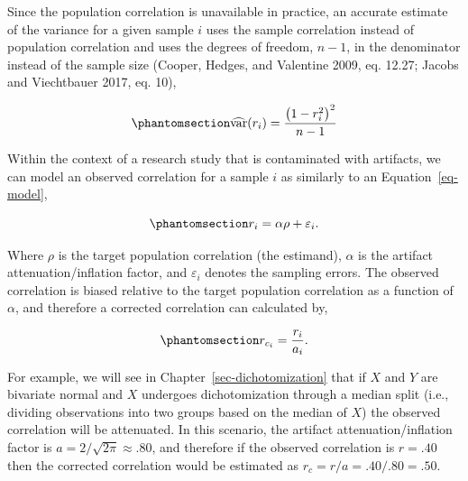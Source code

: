 \documentclass[
  letterpaper,
  DIV=11,
  numbers=noendperiod]{scrreprt}
\begin{document}
Since the population correlation is unavailable in practice, an accurate
estimate of the variance for a given sample \(i\) uses the sample
correlation instead of population correlation and uses the degrees of
freedom, \(n-1\), in the denominator instead of the sample size (Cooper,
Hedges, and Valentine 2009, eq. 12.27; Jacobs and Viechtbauer 2017, eq.
10),

\begin{equation}\phantomsection\label{eq-est-var-r}{
\widehat{\text{var}}(r_i) = \frac{\left(1 - r_i^2\right)^2}{n-1}
}\end{equation}

Within the context of a research study that is contaminated with
artifacts, we can model an observed correlation for a sample \(i\) as
similarly to an Equation~\ref{eq-model},

\begin{equation}\phantomsection\label{eq-model-r}{
r_i = \alpha \rho + \varepsilon_i.
}\end{equation}

Where \(\rho\) is the target population correlation (the estimand),
\(\alpha\) is the artifact attenuation/inflation factor, and
\(\varepsilon_i\) denotes the sampling errors. The observed correlation
is biased relative to the target population correlation as a function of
\(\alpha\), and therefore a corrected correlation can calculated by,

\begin{equation}\phantomsection\label{eq-corr-r}{
r_{c_i} = \frac{r_i}{a_i}.
}\end{equation}

For example, we will see in Chapter~\ref{sec-dichotomization} that if
\(X\) and \(Y\) are bivariate normal and \(X\) undergoes dichotomization
through a median split (i.e., dividing observations into two groups
based on the median of \(X\)) the observed correlation will be
attenuated. In this scenario, the artifact attenuation/inflation factor
is \(a = 2/\sqrt{2\pi} \approx .80\), and therefore if the observed
correlation is \(r = .40\) then the corrected correlation would be
estimated as \(r_c=r/a=.40/.80=.50\).
\end{document}
